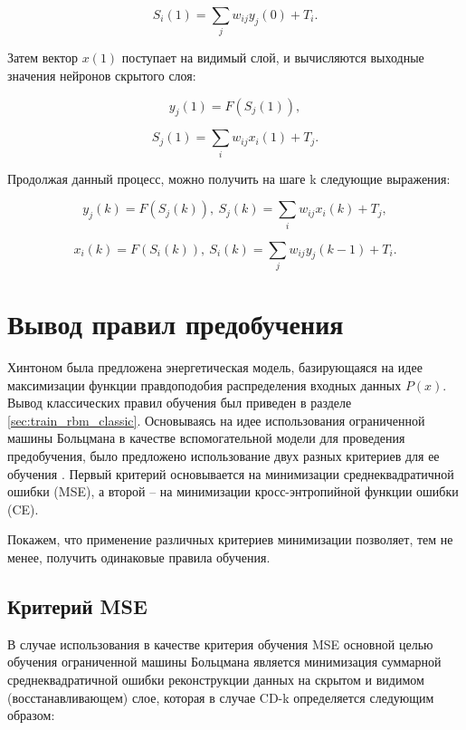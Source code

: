 \begin{equation}
    S_i(1)=\sum_j w_{ij}y_j(0)+T_i.
\end{equation}

Затем вектор $x(1)$ поступает на видимый слой, и вычисляются выходные значения нейронов скрытого слоя: 

\begin{equation}
    y_j(1)=F(S_j(1)),
\end{equation}

\begin{equation}
    S_j(1)=\sum_i w_{ij}x_i(1)+T_j.
\end{equation}

Продолжая данный процесс, можно получить на шаге k следующие выражения:

\begin{equation*}		
    y_j(k)=F(S_j(k)),\ S_j(k)=\sum_i w_{ij}x_i(k)+T_j,
\end{equation*}

\begin{equation*}		
    x_i(k)=F(S_i(k)),\ S_i(k)=\sum_j w_{ij}y_j(k-1)+T_i.
\end{equation*}

\section{Вывод правил предобучения} 

Хинтоном была предложена энергетическая модель, базирующаяся на идее максимизации функции правдоподобия распределения входных данных $P(x)$. Вывод классических правил обучения был приведен в разделе \ref{sec:train_rbm_classic}. Основываясь на идее использования ограниченной машины Больцмана в качестве вспомогательной модели для проведения предобучения, было предложено использование двух разных критериев для ее обучения \cite{4-A}. Первый критерий основывается на минимизации среднеквадратичной ошибки (MSE), а второй -- на минимизации кросс-энтропийной функции ошибки (CE).

Покажем, что применение различных критериев минимизации позволяет, тем не менее, получить одинаковые правила обучения.

\subsection{Критерий MSE}

В случае использования в качестве критерия обучения MSE основной целью обучения ограниченной машины Больцмана является минимизация суммарной среднеквадратичной ошибки реконструкции данных на скрытом и видимом (восстанавливающем) слое, которая в случае CD-k определяется следующим образом:	

